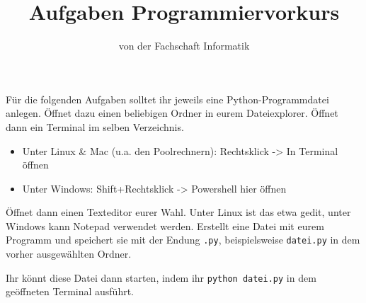
\title{Aufgaben Programmiervorkurs}
\subtitle{von der Fachschaft Informatik\hfill\ptitle}

\maketitle{}

Für die folgenden Aufgaben solltet ihr jeweils eine Python-Programmdatei
anlegen. Öffnet dazu einen beliebigen Ordner in eurem Dateiexplorer. Öffnet
dann ein Terminal im selben Verzeichnis.

\begin{itemize}
    \item Unter Linux \& Mac (u.a. den Poolrechnern): Rechtsklick -> In Terminal öffnen
    \item Unter Windows: Shift+Rechtsklick -> Powershell hier öffnen
\end{itemize}

Öffnet dann einen Texteditor eurer Wahl. Unter Linux ist das etwa gedit, unter
Windows kann Notepad verwendet werden. Erstellt eine Datei mit eurem Programm
und speichert sie mit der Endung \texttt{.py}, beispielsweise \texttt{datei.py}
in dem vorher ausgewählten Ordner.

Ihr könnt diese Datei dann starten, indem ihr \texttt{python datei.py} in dem geöffneten Terminal ausführt.

